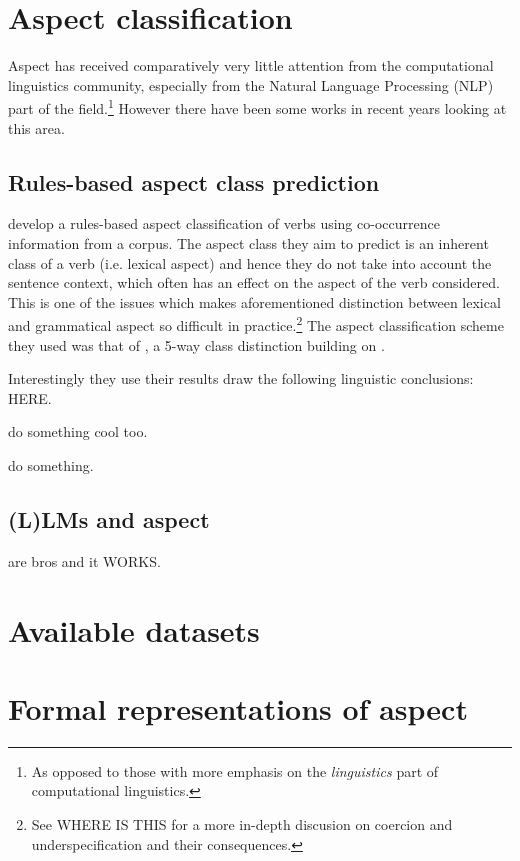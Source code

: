\section{Aspect classification}
Aspect has received comparatively very little attention from the computational linguistics community\citep{friedrich-etal-2023-kind}, especially from the Natural Language Processing (NLP) part of the field.\footnote{As opposed to those with more emphasis on the \emph{linguistics} part of computational linguistics.} However there have been some works in recent years looking at this area.

\subsection{Rules-based aspect class prediction}
\citet{siegel-mckeown-2000-learning} develop a rules-based aspect classification of verbs using co-occurrence information from a corpus. The aspect class they aim to predict is an inherent class of a verb (i.e. lexical aspect) and hence they do not take into account the sentence context, which often has an effect on the aspect of the verb considered. This is one of the issues which makes aforementioned distinction between lexical and grammatical aspect so difficult in practice.\footnote{See WHERE IS THIS for a more in-depth discusion on coercion and underspecification and their consequences.} The aspect classification scheme they used was that of \citet{moens-steedman-1988-temporal}, a 5-way class distinction building on \citet{vendler57}.

Interestingly they use their results draw the following linguistic conclusions: HERE.

\citet{annotAndAutoClassOfAspectCat} do something cool too.

\citet{chen-etal-2021-autoaspect} do something.

\subsection{(L)LMs and aspect}
\citet{metheniti-etal-2022-time} are bros and it WORKS.

\section{Available datasets}

\section{Formal representations of aspect}
